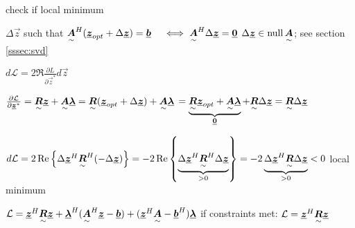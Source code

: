 check if local minimum

$\Delta\vec{z}$ such that $\ma{A}^H(\vec{z}_{opt}+\Delta\vec{z})=\vec{b}   
\quad \iff \ma{A}^H\Delta\vec{z} =\vec{0}$ \qquad $\Delta \vec{z}\in \operatorname{null} \ma{A}$; see section \ref{sssec:svd}

$d\mathcal{L}=2\Re{\frac{\partial L}{\partial \vec{z}^*}d\vec{z}}$

$\frac{\partial \mathcal{L}}{\partial \vec{z}^*}=\ma{R}\vec{z}+\ma{A}\vec{\lambda}
=\ma{R}(\vec{z}_{opt}+\Delta \vec{z})+\ma{A}\vec{\lambda}$
$=\underbrace{\ma{R}\vec{z}_{opt}+\ma{A}\vec{\lambda}}_{\vec{0}}+\ma{R}\Delta\vec{z}
=\ma{R}\Delta\vec{z}$

$d\mathcal{L}=2\Re{\Delta \vec{z}^H\ma{R}^H(-\Delta \vec{z})}
=-2\Re{\underbrace{\Delta \vec{z}^H\ma{R}^H\Delta\vec{z}}_{>0}}=-2\underbrace{\Delta\vec{z}^H\ma{R}\Delta\vec{z}}_{>0}<0$ \quad local minimum

$\mathcal{L}=\vec{z}^H\ma{R}\vec{z}+\vec{\lambda}^H(\ma{A}^H\vec{z}-\vec{b})+(\vec{z}^H\ma{A}-\vec{b}^H)\vec{\lambda}$ \quad if constraints met: $\mathcal{L}=\vec{z}^H\ma{R}\vec{z}$